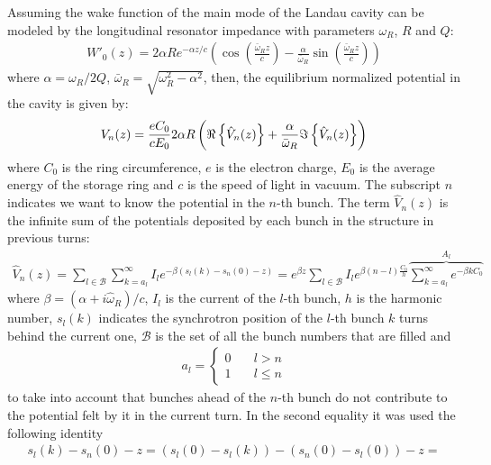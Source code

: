 \begin{apendicesenv}
    Assuming the wake function of the main mode of the Landau cavity can be modeled by the longitudinal resonator impedance with parameters $\omega_R$, $R$ and $Q$:
    \begin{align}\label{eq:longitudinal_resonator_wake}
        W'_0(z) = 2\alpha Re^{-\alpha z/c}\left(\cos\left(\frac{\bar{\omega}_Rz}{c}\right)-
                                \frac{\alpha}{\bar{\omega}_R}
                                    \sin\left(\frac{\bar{\omega}_Rz}{c}\right)\right)
    \end{align}
    where $\alpha = \omega_R/2Q$, $\bar{\omega}_R=\sqrt{\omega_R^2-\alpha^2}$, then, the equilibrium normalized potential in the cavity is given by:
    \begin{align}\label{eq:total_potential}
        V_n(z) = \frac{eC_0}{cE_0}2\alpha R\left(\Re\left\{\hat{V}_n(z)\right\}+\frac{\alpha}{\bar{\omega}_R}\Im\left\{\hat{V}_n(z)\right\}\right)
    \end{align}
    where $C_0$ is the ring circumference, $e$ is the electron charge, $E_0$ is the average energy of the storage ring and $c$ is the speed of light in vacuum. The subscript $n$ indicates we want to know the potential in the $n$-th bunch. The term $\hat{V}_n(z)$ is the infinite sum of the potentials deposited by each bunch in the structure in previous turns:
    \begin{align}
        \hat{V}_n(z) = \sum_{l\in\mathscr{B}} \sum_{k=a_l}^\infty I_l e^{-\beta (s_l(k) - s_n(0)-z)}=
                    e^{\beta z}\sum_{l\in\mathscr{B}}I_l e^{\beta(n-l)\frac{C_0}{h}}
                    \overbrace{\sum_{k=a_l}^\infty e^{-\beta k C_0}}^{A_l}
    \end{align}
    where $\beta = (\alpha + i \hat{\omega}_R) / c$, $I_l$ is the current of the $l$-th bunch, $h$ is the harmonic number, $s_l(k)$ indicates the synchrotron position of the $l$-th bunch $k$ turns behind the current one, $\mathscr{B}$ is the set of all the bunch numbers that are filled and
    \begin{align}
        a_l = \left\{\begin{aligned}0\quad &l > n\\1\quad &l\leq n\end{aligned}\right.
    \end{align}
    to take into account that bunches ahead of the $n$-th bunch do not contribute to the potential  felt by it in the current turn. In the second equality it was used the following identity
    \begin{align}
        s_l(k) - s_n(0) - z = \left(s_l(0) - s_l(k)\right) - \left(s_n(0) - s_l(0)\right) - z =

\end{align}
\end{apendicesenv}
